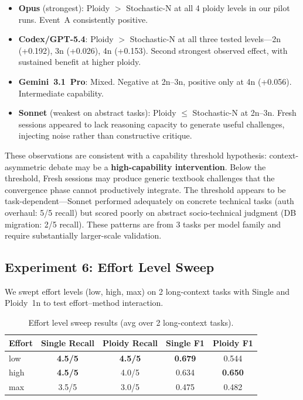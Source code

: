 \documentclass[11pt]{article}
\begin{document}
\begin{itemize}[leftmargin=1.5em]
  \item \textbf{Opus} (strongest): Ploidy $>$ Stochastic-N at all 4 ploidy levels in our pilot runs. Event~A consistently positive.
  \item \textbf{Codex/GPT-5.4}: Ploidy $>$ Stochastic-N at all three tested levels---2n (+0.192), 3n (+0.026), 4n (+0.153). Second strongest observed effect, with sustained benefit at higher ploidy.
  \item \textbf{Gemini~3.1~Pro}: Mixed. Negative at 2n--3n, positive only at 4n (+0.056). Intermediate capability.
  \item \textbf{Sonnet} (weakest on abstract tasks): Ploidy $\leq$ Stochastic-N at 2n--3n. Fresh sessions appeared to lack reasoning capacity to generate useful challenges, injecting noise rather than constructive critique.
\end{itemize}

These observations are consistent with a capability threshold hypothesis: context-asymmetric debate may be a \textbf{high-capability intervention}. Below the threshold, Fresh sessions may produce generic textbook challenges that the convergence phase cannot productively integrate. The threshold appears to be task-dependent---Sonnet performed adequately on concrete technical tasks (auth overhaul: 5/5 recall) but scored poorly on abstract socio-technical judgment (DB migration: 2/5 recall). These patterns are from 3 tasks per model family and require substantially larger-scale validation.

\subsection{Experiment 6: Effort Level Sweep}
\label{sec:effort-sweep}

We swept effort levels (low, high, max) on 2 long-context tasks with Single and Ploidy~1n to test effort--method interaction.

\begin{table}[H]
\centering
\caption{Effort level sweep results (avg over 2 long-context tasks).}
\label{tab:effort-sweep}
\small
\begin{tabular}{@{}lcccc@{}}
\toprule
\textbf{Effort} & \textbf{Single Recall} & \textbf{Ploidy Recall} & \textbf{Single F1} & \textbf{Ploidy F1} \\
\midrule
low  & \textbf{4.5/5} & \textbf{4.5/5} & \textbf{0.679} & 0.544 \\
high & \textbf{4.5/5} & 4.0/5 & 0.634 & \textbf{0.650} \\
max  & 3.5/5 & 3.0/5 & 0.475 & 0.482 \\
\bottomrule
\end{tabular}
\end{table}
\end{document}
